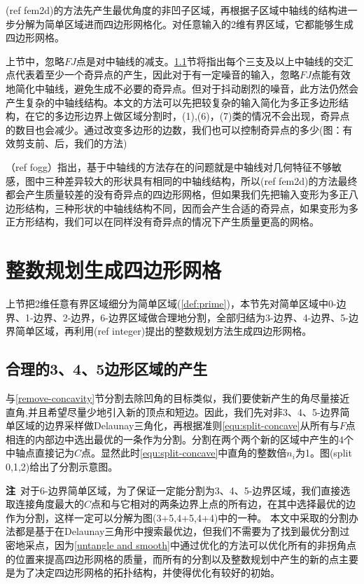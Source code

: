 (ref fem2d)的方法先产生最优角度的非凹子区域，再根据子区域中轴线的结构进一步分解为简单区域进而四边形网格化。对任意输入的2维有界区域，它都能够生成四边形网格。

上节中，忽略$FJ$点是对中轴线的减支。\ref{sec:split-C-F}节将指出每个三支及以上中轴线的交汇点代表着至少一个奇异点的产生，因此对于有一定噪音的输入，忽略$FJ$点能有效地简化中轴线，避免生成不必要的奇异点。但对于抖动剧烈的噪音，此方法仍然会产生复杂的中轴线结构。本文的方法可以先把较复杂的输入简化为多正多边形结构，在它的多边形边界上做区域分割时，(1),(6)，(7)类的情况不会出现，奇异点的数目也会减少。通过改变多边形的边数，我们也可以控制奇异点的多少(图：有效剪支前、后，我们的方法)

（ref fogg）指出，基于中轴线的方法存在的问题就是中轴线对几何特征不够敏感，图中三种差异较大的形状具有相同的中轴线结构，所以(ref fem2d)的方法最终都会产生质量较差的没有奇异点的四边形网格，但如果我们先把输入变形为多正八边形结构，三种形状的中轴线结构不同，因而会产生合适的奇异点，如果变形为多正方形结构，我们可以在同样没有奇异点的情况下产生质量更高的网格。
 
\section{整数规划生成四边形网格}\label{sec:prime_meshing}
上节把2维任意有界区域细分为简单区域(\ref{def:prime})，本节先对简单区域中0-边界、1-边界、2-边界，6-边界区域做合理地分割，全部归结为3-边界、4-边界、5-边界简单区域，再利用(ref integer)提出的整数规划方法生成四边形网格。
\subsection{合理的3、4、5边形区域的产生}\label{sec:split-C-F}
与\ref{remove-concavity}节分割去除凹角的目标类似，我们要使新产生的角尽量接近直角,并且希望尽量少地引入新的顶点和短边。因此，我们先对非3、4、5-边界简单区域的边界采样做Delaunay三角化，再根据准则\ref{equ:split-concave}从所有与$F$点相连的内部边中选出最优的一条作为分割。分割在两个两个新的区域中产生的4个中轴点直接记为$C$点。显然此时\ref{equ:split-concave}中直角的整数倍$n_i$为1。图(split 0,1,2)给出了分割示意图。

\textbf{注}\, 对于6-边界简单区域，为了保证一定能分割为3、4、5-边界区域，我们直接选取连接角度最大的$C$点和与它相对的两条边界上点的所有边，在其中选择最优的边作为分割，这样一定可以分解为图(3+5,4+5,4+4)中的一种。
本文中采取的分割办法都是基于在Delaunay三角形中搜索最优边，但我们不需要为了找到最优分割过密地采点，因为\ref{untangle and smooth}中通过优化的方法可以优化所有的非拐角点的位置来提高四边形网格的质量，而所有的分割以及整数规划中产生的新的点主要是为了决定四边形网格的拓扑结构，并使得优化有较好的初始。
